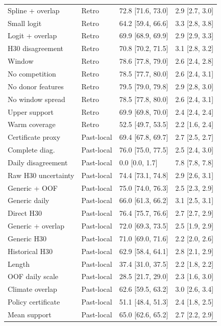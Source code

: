 {\begin{longtable}{p{}p{}p{}p{}}
Spline + overlap & Retro & 72.8 [71.6, 73.0] & 2.9 [2.7, 3.0] \\
Small logit & Retro & 64.2 [59.4, 66.6] & 3.3 [2.8, 3.8] \\
Logit + overlap & Retro & 69.9 [68.9, 69.9] & 2.9 [2.9, 3.3] \\
H30 disagreement & Retro & 70.8 [70.2, 71.5] & 3.1 [2.8, 3.2] \\
Window & Retro & 78.6 [77.8, 79.0] & 2.6 [2.4, 2.8] \\
No competition & Retro & 78.5 [77.7, 80.0] & 2.6 [2.4, 3.1] \\
No donor features & Retro & 79.5 [79.0, 79.8] & 2.9 [2.8, 3.0] \\
No window spread & Retro & 78.5 [77.8, 80.0] & 2.6 [2.4, 3.1] \\
Upper support & Retro & 69.9 [69.8, 70.0] & 2.4 [2.4, 2.4] \\
Warm coverage & Retro & 52.5 [49.7, 53.5] & 2.2 [1.6, 2.4] \\
Certificate proxy & Past-local & 69.4 [67.8, 69.7] & 2.7 [2.5, 2.7] \\
Complete diag. & Past-local & 76.0 [75.0, 77.5] & 2.5 [2.4, 3.0] \\
Daily disagreement & Past-local & 0.0 [0.0, 1.7] & 7.8 [7.8, 7.8] \\
Raw H30 uncertainty & Past-local & 74.4 [73.1, 74.8] & 2.9 [2.6, 3.1] \\
Generic + OOF & Past-local & 75.0 [74.0, 76.3] & 2.5 [2.3, 2.9] \\
Generic daily & Past-local & 66.0 [61.3, 66.2] & 3.1 [2.5, 3.1] \\
Direct H30 & Past-local & 76.4 [75.7, 76.6] & 2.7 [2.7, 2.9] \\
Generic + overlap & Past-local & 72.0 [69.3, 73.5] & 2.5 [1.9, 2.9] \\
Generic H30 & Past-local & 71.0 [69.0, 71.6] & 2.2 [2.0, 2.6] \\
Historical H30 & Past-local & 62.9 [58.4, 64.1] & 2.8 [2.1, 2.9] \\
Length & Past-local & 37.4 [31.0, 37.5] & 2.2 [1.8, 2.2] \\
OOF daily scale & Past-local & 28.5 [21.7, 29.0] & 2.3 [1.6, 3.0] \\
Climate overlap & Past-local & 62.6 [59.5, 63.2] & 3.0 [2.6, 3.4] \\
Policy certificate & Past-local & 51.1 [48.4, 51.3] & 2.4 [1.8, 2.5] \\
Mean support & Past-local & 65.0 [62.6, 65.2] & 2.7 [2.2, 2.9] \\

\end{longtable}}
